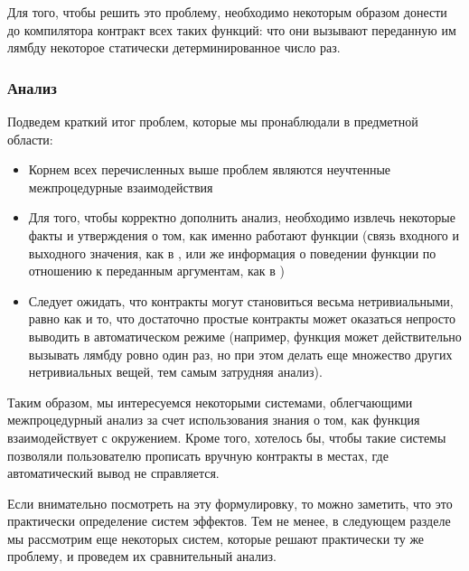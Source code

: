 Для того, чтобы решить это проблему, необходимо некоторым образом донести до компилятора контракт всех таких функций: что они вызывают переданную им лямбду некоторое статически детерминированное число раз. 





\subsubsection{Анализ}

Подведем краткий итог проблем, которые мы пронаблюдали в предметной области:

\begin{itemize}
    \item Корнем всех перечисленных выше проблем являются неучтенные межпроцедурные взаимодействия
    
    \item Для того, чтобы корректно дополнить анализ, необходимо извлечь некоторые факты и утверждения о том, как именно работают функции (связь входного и выходного значения, как в , или же информация о поведении функции по отношению к переданным аргументам, как в )
    
    \item Следует ожидать, что контракты могут становиться весьма нетривиальными, равно как и то, что достаточно простые контракты может оказаться непросто выводить в автоматическом режиме (например, функция может действительно вызывать лямбду ровно один раз, но при этом делать еще множество других нетривиальных вещей, тем самым затрудняя анализ).
\end{itemize}

Таким образом, мы интересуемся некоторыми системами, облегчающими межпроцедурный анализ за счет использования знания о том, как функция взаимодействует с окружением. Кроме того, хотелось бы, чтобы такие системы позволяли пользователю прописать вручную контракты в местах, где автоматический вывод не справляется.

Если внимательно посмотреть на эту формулировку, то можно заметить, что это практически определение систем эффектов. Тем не менее, в следующем разделе мы рассмотрим еще некоторых систем, которые решают практически ту же проблему, и проведем их сравнительный анализ.










